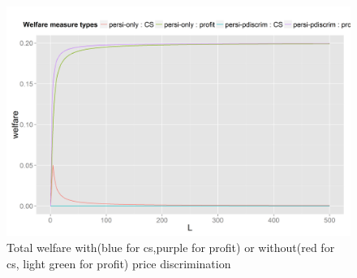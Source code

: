 \documentclass[11pt, oneside]{article}   	%
\begin{document}
\begin{figure}
\includegraphics[width= 1\textwidth ,height =0.6\textheight]{compareTprofitANDCS-persi-pdiscrimvspersi-only.png}
\caption{Total welfare with(blue for cs,purple for profit) or without(red for cs, light green for profit) price discrimination}
\label{fig:pi-cs-comp}
\end{figure}
\end{document}
